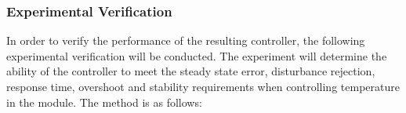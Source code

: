 


\subsubsection{Experimental Verification}

In order to verify the performance of the resulting controller, the following experimental verification will be conducted. The experiment will determine the ability of the controller to meet the steady state error, disturbance rejection, response time, overshoot and stability requirements when controlling temperature in the module. The method is as follows:

